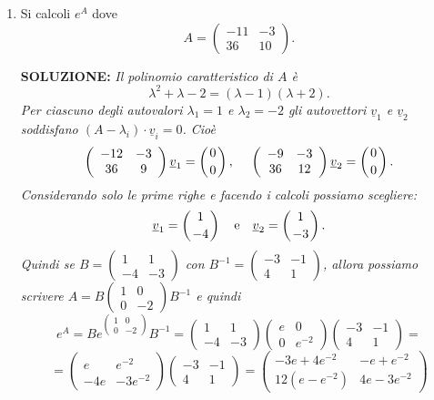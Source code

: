 \documentclass[12pt,a4paper]{report}\pagenumbering{roman}
\begin{document}
\begin{enumerate}
\item Si calcoli $e^A$ dove 
$$A=\left(\begin{array}{cc}
-11 & -3 \\
 36 & 10
\end{array}\right).$$

{\bf SOLUZIONE:} {\it Il polinomio caratteristico di $A$ \`e 
$$\lambda^2+\lambda-2=(\lambda-1)(\lambda+2).$$
Per ciascuno degli autovalori $\lambda_1=1$ e $\lambda _2=-2$ gli autovettori $\underline{v}_1$ e
$\underline{v}_2$ soddisfano $(A-\lambda_i)\cdot\underline{v}_i=0$. Cio\`e
$$\left(\begin{array}{cc}
-12 & -3 \\
36 & 9
\end{array}\right)\underline{v}_1=\left({0\atop0}\right),\ \ \ \
\left(\begin{array}{cc}
-9 & -3 \\
36 & 12
\end{array}\right)\underline{v}_2=\left({0\atop0}\right).$$
Considerando solo le prime righe e facendo i calcoli possiamo scegliere:
$$\underline{v}_1=\left({1\atop -4}\right)\ \ \ \mbox{e}\ \ \ \underline{v}_2=\left({1\atop-3}\right).$$
Quindi se $B=\left(\begin{array}{cc}
1 &  1\\
-4 & -3
\end{array}\right)$ con $B^{-1}=\left(\begin{array}{cc}
-3 &  -1\\
4 & 1
\end{array}\right)$, allora possiamo scrivere $A=B\left(\begin{array}{cc}
1 & 0 \\
0 & -2
\end{array}\right)B^{-1}$
e quindi 
$$e^A=Be^{\left(\begin{array}{cc}
1 & 0 \\
0 & -2
\end{array}\right)}B^{-1}=\left(\begin{array}{cc}
1 &  1\\
-4 & -3
\end{array}\right)\left(\begin{array}{cc}
e & 0 \\
0 & e^{-2}
\end{array}\right)\left(\begin{array}{cc}
-3 &  -1\\
4 & 1
\end{array}\right)=$$
$$=\left(\begin{array}{cc}
e &  e^{-2}\\
-4e & -3e^{-2}
\end{array}\right)\left(\begin{array}{cc}
-3 &  -1\\
4 & 1
\end{array}\right)=\left(\begin{array}{ll}
-3e+4e^{-2} &  -e+e^{-2}\\
12(e-e^{-2}) & 4e-3e^{-2}
\end{array}\right)$$}


\end{enumerate}
\end{document}
